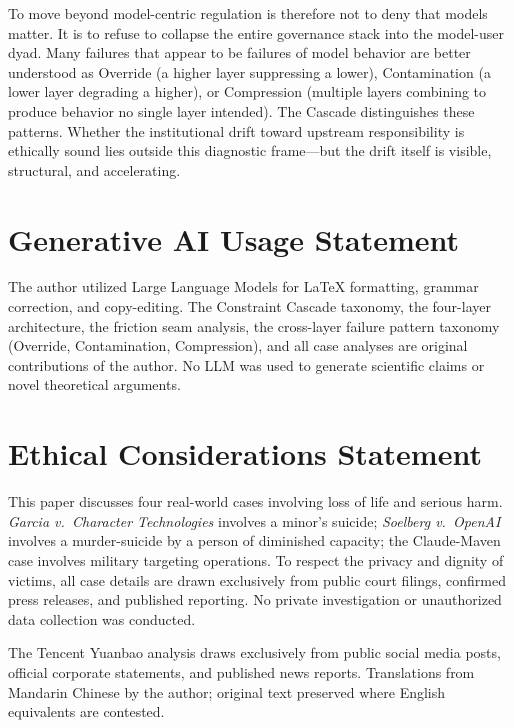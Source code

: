 \documentclass[11pt]{article}
\begin{document}
To move beyond model-centric regulation is therefore not to deny that models matter. It is to refuse to collapse the entire governance stack into the model-user dyad. Many failures that appear to be failures of model behavior are better understood as Override (a higher layer suppressing a lower), Contamination (a lower layer degrading a higher), or Compression (multiple layers combining to produce behavior no single layer intended). The Cascade distinguishes these patterns. Whether the institutional drift toward upstream responsibility is ethically sound lies outside this diagnostic frame---but the drift itself is visible, structural, and accelerating.

\section*{Generative AI Usage Statement}

The author utilized Large Language Models for \LaTeX{} formatting, grammar correction, and copy-editing. The Constraint Cascade taxonomy, the four-layer architecture, the friction seam analysis, the cross-layer failure pattern taxonomy (Override, Contamination, Compression), and all case analyses are original contributions of the author. No LLM was used to generate scientific claims or novel theoretical arguments.

\section*{Ethical Considerations Statement}

This paper discusses four real-world cases involving loss of life and serious harm. \emph{Garcia v.\ Character Technologies} involves a minor's suicide; \emph{Soelberg v.\ OpenAI} involves a murder-suicide by a person of diminished capacity; the Claude-Maven case involves military targeting operations. To respect the privacy and dignity of victims, all case details are drawn exclusively from public court filings, confirmed press releases, and published reporting. No private investigation or unauthorized data collection was conducted.

The Tencent Yuanbao analysis draws exclusively from public social media posts, official corporate statements, and published news reports. Translations from Mandarin Chinese by the author; original text preserved where English equivalents are contested.
\end{document}
